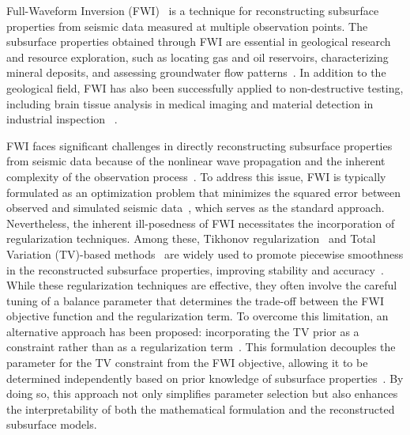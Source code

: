 Full-Waveform Inversion (FWI)~\cite{FWI0,FWI1} is a technique for reconstructing subsurface properties from seismic data measured at multiple observation points.
The subsurface properties obtained through FWI are essential in geological research and resource exploration, such as locating gas and oil reservoirs, characterizing mineral deposits, and assessing groundwater flow patterns~\cite{FWI1,FWIApplicationGroundwater0,FWIApplicationGroundwater1}.
In addition to the geological field, FWI has also been successfully applied to non-destructive testing, including brain tissue analysis in medical imaging and material detection in industrial inspection ~\cite{FWIApplicationNonDestructiveTesting0,FWIApplicationNonDestructiveTesting1}.

FWI faces significant challenges in directly reconstructing subsurface properties from seismic data because of the nonlinear wave propagation and the inherent complexity of the observation process~\cite{FWI1}.
To address this issue, FWI is typically formulated as an optimization problem that minimizes the squared error between observed and simulated seismic data~\mbox{\cite{FWI0,CustomFWI0,CustomFWI1,CustomFWI2,CustomFWI3,CustomFWI4,CustomFWI5}}, which serves as the standard approach.
Nevertheless, the inherent ill-posedness of FWI necessitates the incorporation of regularization techniques.
Among these, Tikhonov regularization~\cite{tikhonov} and Total Variation (TV)-based methods~\cite{TV,TGV} are widely used to promote piecewise smoothness in the reconstructed subsurface properties, improving stability and accuracy~\cite{FWI-with-tikhonov-regularization,FWI-with-TV-regularization,FWI-with-directional-TV-regularization,FWI-with-high-order-TV-regularization,FWI-with-TGV-regularization}.
While these regularization techniques are effective, they often involve the careful tuning of a balance parameter that determines the trade-off between the FWI objective function and the regularization term.
To overcome this limitation, an alternative approach has been proposed: incorporating the TV prior as a constraint rather than as a regularization term~\cite{FWI-with-TV-constraint,FWI-with-TV-constraint2,FWI-with-TV-constraint3,FWI-with-TV-constraint4}.
This formulation decouples the parameter for the TV constraint from the FWI objective, allowing it to be determined independently based on prior knowledge of subsurface properties~\cite{constraint0,constraint1,constraint2,constraint3,constraint4,constraints-vs-penalties-in-FWI}.
By doing so, this approach not only simplifies parameter selection but also enhances the interpretability of both the mathematical formulation and the reconstructed subsurface models.

